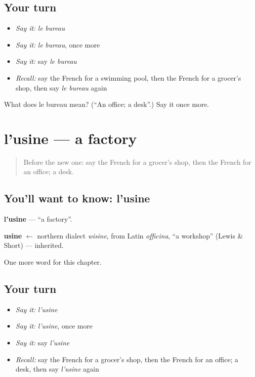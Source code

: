 \subsection*{Your turn}
\begin{itemize}
\raggedright
  \item \emph{Say it:} \emph{le bureau}
  \item \emph{Say it:} \emph{le bureau}, once more
  \item \emph{Say it:} say \emph{le bureau}
  \item \emph{Recall:} say the French for a swimming pool, then the French for a grocer's shop, then say \emph{le bureau} again
\end{itemize}

\begin{tcolorbox}[breakable,colback=teal!4,colframe=teal!35!black,title={Before you move on}]
What does le bureau mean? (\textquotedblleft{}An office; a desk\textquotedblright{}.) Say it once more.
\end{tcolorbox}
\section[l'usine]{l'usine — a factory}

\label{lesson:FR-C108-usine}



\begin{quote}
Before the new one: say the French for a grocer's shop, then the French for an office; a desk.
\end{quote}

\subsection*{You'll want to know: l'usine}
\textbf{l'usine} — \textquotedblleft{}a factory\textquotedblright{}.

\begin{cousinweb}
\textbf{usine} $\leftarrow$ northern dialect \emph{wisine}, from Latin \emph{officina}, \textquotedblleft{}a workshop\textquotedblright{} (Lewis \& Short) — inherited.
\end{cousinweb}

\begin{grammarlens}[title={What you've built}]
One more word for this chapter.
\end{grammarlens}

\subsection*{Your turn}
\begin{itemize}
\raggedright
  \item \emph{Say it:} \emph{l'usine}
  \item \emph{Say it:} \emph{l'usine}, once more
  \item \emph{Say it:} say \emph{l'usine}
  \item \emph{Recall:} say the French for a grocer's shop, then the French for an office; a desk, then say \emph{l'usine} again
\end{itemize}

